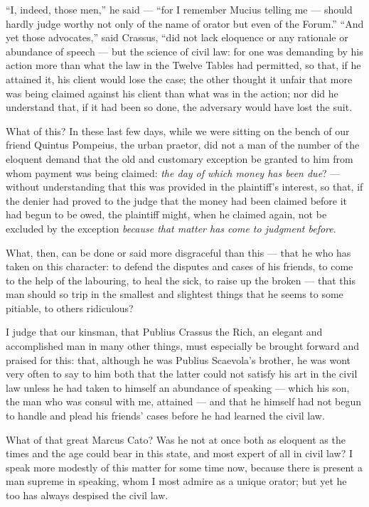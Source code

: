  ``I, indeed, those men,'' he said — ``for I remember Mucius telling me — should hardly judge worthy not only of the name of orator but even of the Forum.'' ``And yet those advocates,'' said Crassus, ``did not lack eloquence or any rationale or abundance of speech — but the science of civil law: for one was demanding by his action more than what the law in the Twelve Tables had permitted, so that, if he attained it, his client would lose the case; the other thought it unfair that more was being claimed against his client than what was in the action; nor did he understand that, if it had been so done, the adversary would have lost the suit.

 What of this? In these last few days, while we were sitting on the bench of our friend Quintus Pompeius, the urban praetor, did not a man of the number of the eloquent demand that the old and customary exception be granted to him from whom payment was being claimed: \textit{the day of which money has been due}? — without understanding that this was provided in the plaintiff's interest, so that, if the denier had proved to the judge that the money had been claimed before it had begun to be owed, the plaintiff might, when he claimed again, not be excluded by the exception \textit{because that matter has come to judgment before}.

 What, then, can be done or said more disgraceful than this — that he who has taken on this character: to defend the disputes and cases of his friends, to come to the help of the labouring, to heal the sick, to raise up the broken — that this man should so trip in the smallest and slightest things that he seems to some pitiable, to others ridiculous?

 I judge that our kinsman, that Publius Crassus the Rich, an elegant and accomplished man in many other things, must especially be brought forward and praised for this: that, although he was Publius Scaevola's brother, he was wont very often to say to him both that the latter could not satisfy his art in the civil law unless he had taken to himself an abundance of speaking — which his son, the man who was consul with me, attained — and that he himself had not begun to handle and plead his friends' cases before he had learned the civil law.

 What of that great Marcus Cato? Was he not at once both as eloquent as the times and the age could bear in this state, and most expert of all in civil law? I speak more modestly of this matter for some time now, because there is present a man supreme in speaking, whom I most admire as a unique orator; but yet he too has always despised the civil law.

